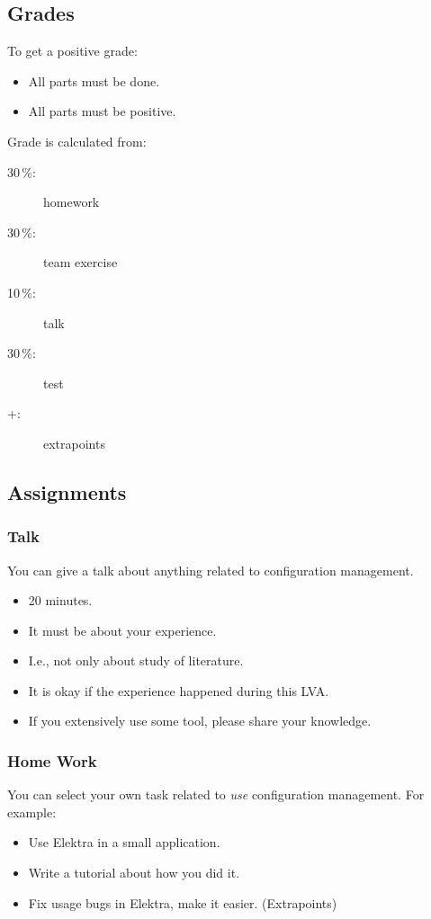 \documentclass{beamer}
\begin{document}
\subsection{Grades}
\begin{frame}
	To get a positive grade:
	\begin{itemize}
		\item All parts must be done.
		\item All parts must be positive.
	\end{itemize}
\end{frame}

\begin{frame}
	Grade is calculated from:
	\begin{description}
	\item[30\,\%:] homework
	\item[30\,\%:] team exercise
	\item[10\,\%:] talk
	\item[30\,\%:] test
	\item[+:] extrapoints
	\end{description}
\end{frame}

\subsection{Assignments}
\begin{frame}
	\frametitle{Talk}
	You can give a talk about anything related to configuration management.
	\begin{itemize}
		\item 20 minutes.
		\item It must be about your experience.
		\item I.e., not only about study of literature.
		\item It is okay if the experience happened during this LVA.
		\item If you extensively use some tool, please share your knowledge.
	\end{itemize}
\end{frame}

\begin{frame}
	\frametitle{Home Work}
	You can select your own task related to \emph{use} configuration management.
	For example:
	\begin{itemize}
		\item Use Elektra in a small application.
		\item Write a tutorial about how you did it.
		\item Fix usage bugs in Elektra, make it easier. (Extrapoints)
	\end{itemize}
\end{frame}
\end{document}
